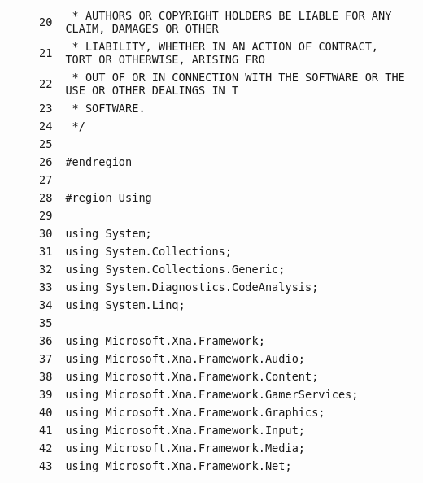 \documentclass[a4paper,10pt]{article}
\begin{document}
\begin{longtable}[l]{lrrl}
\cellcolor{gray} &  & \verb~20~ & \verb~ * AUTHORS OR COPYRIGHT HOLDERS BE LIABLE FOR ANY CLAIM, DAMAGES OR OTHER~\\
\cellcolor{gray} &  & \verb~21~ & \verb~ * LIABILITY, WHETHER IN AN ACTION OF CONTRACT, TORT OR OTHERWISE, ARISING FRO~\\
\cellcolor{gray} &  & \verb~22~ & \verb~ * OUT OF OR IN CONNECTION WITH THE SOFTWARE OR THE USE OR OTHER DEALINGS IN T~\\
\cellcolor{gray} &  & \verb~23~ & \verb~ * SOFTWARE.~\\
\cellcolor{gray} &  & \verb~24~ & \verb~ */~\\
\cellcolor{gray} &  & \verb~25~ & \verb~~\\
\cellcolor{gray} &  & \verb~26~ & \verb~#endregion~\\
\cellcolor{gray} &  & \verb~27~ & \verb~~\\
\cellcolor{gray} &  & \verb~28~ & \verb~#region Using~\\
\cellcolor{gray} &  & \verb~29~ & \verb~~\\
\cellcolor{gray} &  & \verb~30~ & \verb~using System;~\\
\cellcolor{gray} &  & \verb~31~ & \verb~using System.Collections;~\\
\cellcolor{gray} &  & \verb~32~ & \verb~using System.Collections.Generic;~\\
\cellcolor{gray} &  & \verb~33~ & \verb~using System.Diagnostics.CodeAnalysis;~\\
\cellcolor{gray} &  & \verb~34~ & \verb~using System.Linq;~\\
\cellcolor{gray} &  & \verb~35~ & \verb~~\\
\cellcolor{gray} &  & \verb~36~ & \verb~using Microsoft.Xna.Framework;~\\
\cellcolor{gray} &  & \verb~37~ & \verb~using Microsoft.Xna.Framework.Audio;~\\
\cellcolor{gray} &  & \verb~38~ & \verb~using Microsoft.Xna.Framework.Content;~\\
\cellcolor{gray} &  & \verb~39~ & \verb~using Microsoft.Xna.Framework.GamerServices;~\\
\cellcolor{gray} &  & \verb~40~ & \verb~using Microsoft.Xna.Framework.Graphics;~\\
\cellcolor{gray} &  & \verb~41~ & \verb~using Microsoft.Xna.Framework.Input;~\\
\cellcolor{gray} &  & \verb~42~ & \verb~using Microsoft.Xna.Framework.Media;~\\
\cellcolor{gray} &  & \verb~43~ & \verb~using Microsoft.Xna.Framework.Net;~\\

\end{longtable}
\end{document}

